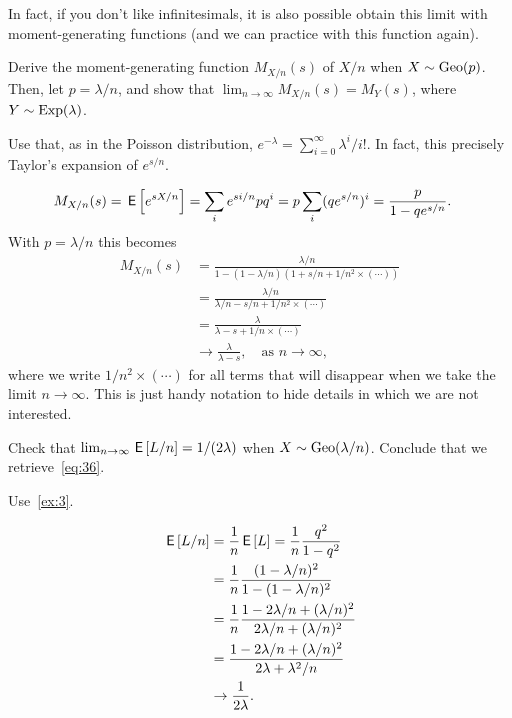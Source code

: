 \documentclass[a4paper,12pt]{article}
\begin{document}
In fact, if you don't like infinitesimals, it is also possible obtain this limit with moment-generating functions (and we can practice with this function again).

\begin{exercise}
Derive the moment-generating function $M_{X/n}(s)$ of $X/n$ when $X\sim \mathrm{Geo}(p)$.
Then, let $p = \lambda/n$, and show that $\lim_{n\to\infty}M_{X/n}(s) = M_{Y}(s)$, where $Y \sim \mathrm{Exp}(\lambda)$.
\begin{hint}
  Use that, as in the Poisson distribution, $e^{-\lambda} = \sum_{i=0}^{\infty}\lambda^{i}/i!$.
  In fact, this precisely Taylor's expansion of $e^{s/n}$.
\end{hint}
\begin{solution}
  \begin{align}
    \label{eq:20}
M_{X/n}(s) 
&= \,\mathsf{E}\left[e^{s X/n}\right] = \sum_{i} e^{s i/n} p q^{i} = p\sum_{i} (qe^{s/n})^{i} = \frac{p}{1-qe^{s/n}}.
  \end{align}
With $p=\lambda/n$ this becomes
  \begin{align}
M_{X/n}(s) 
&= \frac{\lambda/n}{1-(1-\lambda/n) (1+s/n + 1/n^{2}\times(\cdots))} \\
&= \frac{\lambda/n}{\lambda/n - s/n + 1/n^{2}\times (\cdots)} \\
&= \frac{\lambda}{\lambda - s + 1/n\times(\cdots)} \\
&\to \frac{\lambda}{\lambda - s}, \quad\text{as }  n\to \infty,
  \end{align}
  where we write $1/n^{2}\times(\cdots)$ for all terms that will disappear when we take the limit $n\to \infty$.
  This is just handy notation to hide details in which we are not interested.
\end{solution}
\end{exercise}

\begin{exercise}\label{ex:11}
Check that $\lim_{n\to\infty}\,\mathsf{E}\left[L/n\right] = 1/(2\lambda)$ when $X\sim \mathrm{Geo}(\lambda/n)$. Conclude that  we retrieve~\cref{eq:36}.
\begin{hint}
  Use~\cref{ex:3}.
\end{hint}
\begin{solution}
  \begin{align}
    \label{eq:21}
\,\mathsf{E}\left[L/n\right]  &= \frac 1 n \,\mathsf{E}\left[L\right] = \frac 1 n \frac{q^2}{1-q^{2}} \\
 &= \frac 1 n \frac{(1-\lambda/n)^2}{1-(1-\lambda/n)^{2}} \\
 &= \frac 1 n \frac{1-2 \lambda/n + (\lambda/n)^2}{2 \lambda /n + (\lambda/n)^{2}} \\
 &= \frac{1-2 \lambda/n + (\lambda/n)^2}{2 \lambda + \lambda^{2}/n} \\
&\to \frac 1{2\lambda}.
  \end{align}
\end{solution}
\end{exercise}
\end{document}
